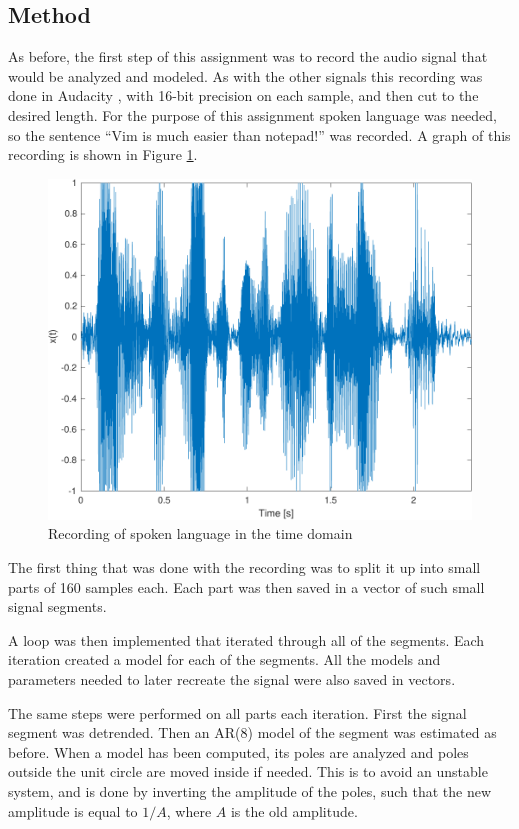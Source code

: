 \documentclass{IEEEtran}
\begin{document}
\subsection{Method}
As before, the first step of this assignment was to record the audio
signal that would be analyzed and modeled. As with the other signals
this recording was done in Audacity \cite{audacity}, with 16-bit
precision on each sample, and then cut to
the desired length. For the purpose of this assignment spoken language
was needed, so the sentence ``Vim is much easier than notepad!'' was
recorded. A graph of this recording is shown in Figure \ref{3:rawvim}.

\begin{figure}[h]
  \centering
  \captionsetup{justification=centering}

  \includegraphics[width=0.8\columnwidth]{pictures/vim_orig.pdf}
  \caption{Recording of spoken language in the time domain}
  \label{3:rawvim}

\end{figure}

The first thing that was done with the recording was to split it up into
small parts of 160 samples each. Each part was then saved in a vector
of such small signal segments.

A loop was then implemented that iterated through all of the segments.
Each iteration created a model for each of the segments. All the models
and parameters needed to later recreate the signal were also saved in
vectors.

The same steps were performed on all parts each iteration. First the
signal segment was detrended. Then an AR(8) model of the segment was
estimated as before. When a model has been computed, its poles are
analyzed and poles outside the unit circle are moved inside if needed.
This is to avoid an unstable system, and is done by inverting the amplitude
of the poles, such that the new amplitude is equal to $1/A$, where $A$ 
is the old amplitude.
\end{document}
